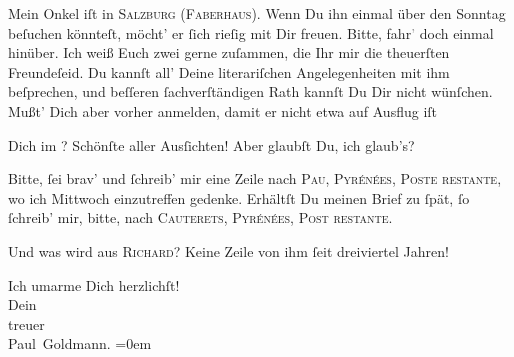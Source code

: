 \pstart
           Mein Onkel iſt in \textsc{Salzburg} (\textsc{Faberhaus}). {\pb}Wenn Du ihn einmal über den Sonntag
               beſuchen könnteſt, möcht’ er{ }ſich rieſig mit Dir freuen. Bitte,
                  fahr\textcolor{gray}{’} doch einmal hinüber. Ich weiß Euch zwei gerne zuſammen,
               die Ihr mir die theuerſten Freundeſeid. Du kannſt all’ Deine literariſchen Angelegenheiten mit ihm
               beſprechen, und beſſeren{ }ſachverſtändigen Rath kannſt Du Dir {\pb}nicht wünſchen. Mußt’ Dich aber vorher anmelden,
               damit er nicht etwa auf Ausflug iſt{\dotsfour}\pend
           
\pstart
           Dich im \label{K_L02701-6v}\label{K_L02701-6}? Schönſte aller Ausſichten! Aber
               glaubſt Du, ich glaub’s? {\dotsfour}\pend
           
\pstart
           Bitte,{ }ſei brav’ und{ }ſchreib’ mir eine Zeile nach \textsc{Pau}, \textsc{Pyrénées}, \textsc{Poste restante}, wo ich Mittwoch einzutreffen gedenke. Erhältſt Du {\pb}meinen Brief zu{ }ſpät,{ }ſo{ }ſchreib’ mir, bitte, nach
                  \textsc{Cauterets}, \textsc{}{ }\textsc{Pyrénées}, \textsc{Post restante}.\pend
           
\pstart
           Und was wird aus \textsc{Richard}? Keine Zeile von ihm{ }ſeit dreiviertel Jahren!\pend
           
\pstart
           Ich umarme Dich herzlichſt! {\\[\baselineskip]}Dein {\\[\baselineskip]}treuer {\\[\baselineskip]}\spacefill\mbox{Paul Goldmann.}\pend
           \leftskip=0em{}\endnumbering{}  \newcommand{\dateiname}{L02701}\newcommand{\titel}{Paul Goldmann an Arthur Schnitzler, 5. 8. [1892]}\newcommand{\editorInnen}{Martin Anton Müller und Laura Untner}
